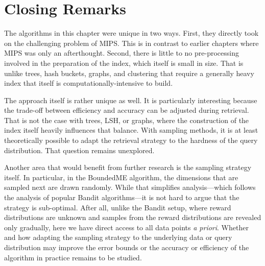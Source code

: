 \section{Closing Remarks}
The algorithms in this chapter were unique in two ways.
First, they directly took on the challenging problem of MIPS.
This is in contrast to earlier chapters where MIPS was only an afterthought.
Second, there is little to no pre-processing involved in the preparation of
the index, which itself is small in size.
That is unlike trees, hash buckets, graphs, and clustering
that require a generally heavy index that itself is computationally-intensive
to build.

The approach itself is rather unique as well. It is particularly interesting
because the trade-off between efficiency and accuracy can be adjusted during retrieval.
That is not the case with trees, LSH, or graphs, where the construction of the index
itself heavily influences that balance. With sampling methods, it is at least
theoretically possible to adapt the retrieval strategy to the hardness of the query
distribution. That question remains unexplored.

Another area that would benefit from further research is the sampling strategy itself.
In particular, in the BoundedME algorithm, the dimensions that are sampled next
are drawn randomly. While that simplifies analysis---which follows the analysis of
popular Bandit algorithms---it is not hard to argue that the strategy is sub-optimal.
After all, unlike the Bandit setup, where reward distributions are unknown and
samples from the reward distributions are revealed only gradually,
here we have direct access to all data points \emph{a priori}.
Whether and how adapting the sampling strategy to the underlying data or query distribution
may improve the error bounds or the accuracy or efficiency of the algorithm in practice
remains to be studied.




